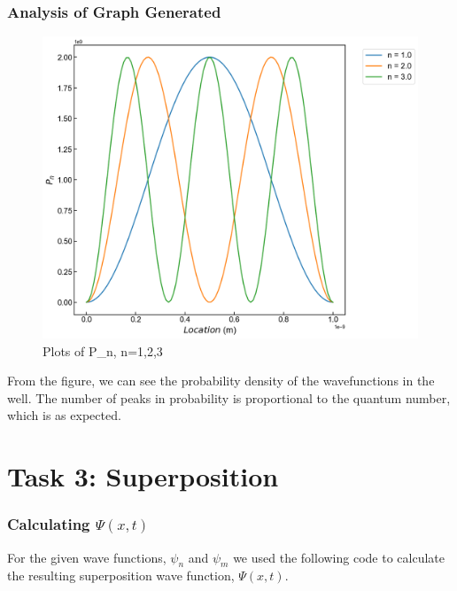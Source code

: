 \documentclass[a4paper,12pt]{article}
\begin{document}
\subsubsection{Analysis of Graph Generated}
\begin{figure}[H]
\includegraphics[width=\columnwidth]{report/figures/P_n.png}
\caption{Plots of P_n, n=1,2,3}
\end{figure}
From the figure, we can see the probability density of the wavefunctions in the well. The number of peaks in probability is proportional to the quantum number, which is as expected. 

\section{Task 3: Superposition}
\subsubsection{Calculating \(\Psi(x,t)\)}
For the given wave functions, \(\psi_n\) and \(\psi_m\) we used the following code to calculate the resulting superposition wave function, \(\Psi(x,t)\).
\end{document}
